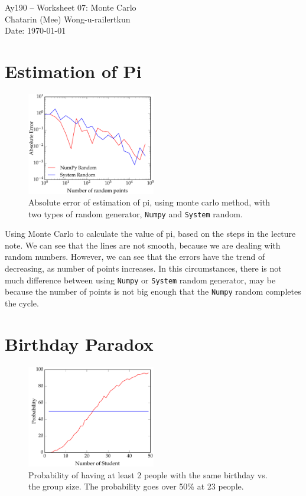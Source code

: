 \documentclass[11pt,letterpaper]{article}
\begin{document}
\begin{center}
\Large
Ay190 -- Worksheet 07: Monte Carlo \\    %
Chatarin (Mee) Wong-u-railertkun\\
Date: \today
\end{center}

\section{Estimation of Pi}

\begin{figure}[h!]
	\centering
	\includegraphics[width=0.5\textwidth]{EstPi}
	\caption{Absolute error of estimation of pi, using monte carlo method, with two types of random generator, \texttt{Numpy} and \texttt{System} random.}
	\label{fig:EstPi}
\end{figure}
	
Using Monte Carlo to calculate the value of pi, based on the steps in the lecture note. We can see that the lines are not smooth, because we are dealing with
random numbers. However, we can see that the errors have the trend of decreasing, as number of points increases. In this circumstances, there is not much difference between using \texttt{Numpy} or \texttt{System} random generator, may be because the number of points is not big enough that the \texttt{Numpy} random completes the cycle.

\section{Birthday Paradox}

\begin{figure}[h!]
	\centering
	\includegraphics[width=0.5\textwidth]{Birthday}
	\caption{Probability of having at least 2 people with the same birthday vs. the group size. The probability goes over 50\% at 23 people.}
	\label{fig:Birthday}
\end{figure}
\end{document}
